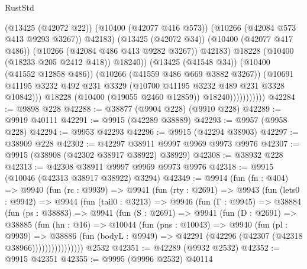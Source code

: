 \begin{lexlean}{RustStd}
\begin{coremodule}
                                    (@13425 (@42072 @22))
                                    (@10400 (@42077 @416 @573))
                                    (@10266 (@42084 @573 @413 @9293 @3267))
                                    @42183)
                                  (@13425 (@42072 @34))
                                  (@10400 (@42077 @417 @486))
                                  (@10266 (@42084 @486 @413 @9282 @3267))
                                  @42183)
                                @18228
                                (@10400 (@18233 @205 @2412 @418))
                                @18240))
                            (@13425 (@41548 @34))
                            (@10400 (@41552 @12858 @486))
                            (@10266 (@41559 @486 @669 @3882 @3267))
                            (@10691
                              @41195
                              @3232
                              @492
                              @231
                              @3329
                              (@10700 @41195 @3232 @489 @231 @3328 @10842)))
                          @18228
                          (@10400 (@19055 @2460 @12859))
                          @18240)))))))))))
@42284 := @9898 @228
@42288 := @38877 (@9904 @228) (@9910 @228)
@42289 := @9919 @40111
@42291 := @9915 (@42289 @38889)
@42293 := @9957 (@9958 @228)
@42294 := @9953 @42293
@42296 := @9915 (@42294 @38903)
@42297 := @38909 @228
@42302 := @42297 @38911 @9997 @9969 @9973 @9976
@42307 := @9915 (@38908 (@42302 @38917 @38922) @38929)
@42308 := @38932 @228
@42313 := @42308 @38911 @9997 @9969 @9973 @9976
@42318 := @9915 (@10046 (@42313 @38917 @38922) @3294)
@42349 := @9914
    (fun (fn : @404) =>
    @9940
      (fun (rc : @9939) =>
      @9941
        (fun (rty : @2691) =>
        @9943
          (fun (lets0 : @9942) =>
          @9944
            (fun (tail0 : @3213) =>
            @9946
              (fun (Γ : @9945) =>
              @38884
                (fun (ps : @38883) =>
                @9941
                  (fun (S : @2691) =>
                  @9941
                    (fun (D : @2691) =>
                    @38885
                      (fun (hn : @16) =>
                      @10044
                        (fun (pns : @10043) =>
                        @9940
                          (fun (pl : @9939) =>
                          @38886
                            (fun (bodyL : @9949) =>
                            @42291 (@42296 (@42307 (@42318 @38966))))))))))))))))
    @2532
@42351 := @42289 (@9932 @2532)
@42352 := @9915 @42351
@42355 := @9995 (@9996 @2532) @40114

\end{coremodule}
\end{lexlean}

